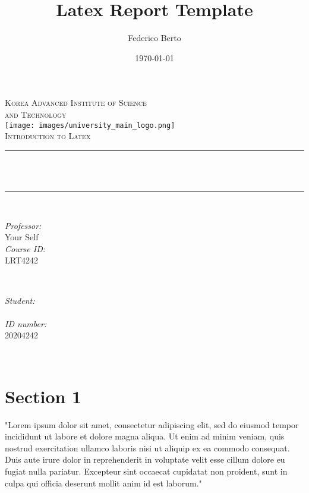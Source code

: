 \documentclass[12pt]{article}
\title{Latex Report Template}
\author{Federico Berto}
\date{\today}
\makeatletter
\newcommand{\professor}{Your Self}
\newcommand{\studentid}{20204242}
\newcommand{\coursename}{Introduction to Latex}
\newcommand{\courseid}{LRT4242}
\newcommand{\firstuniversityline}{Korea Advanced Institute of Science} %
\newcommand{\seconduniversityline}{and Technology} %
\let\thetitle\@title
\let\theauthor\@author
\makeatother
\begin{document}
\begin{titlepage}
	\centering
    \textsc{\LARGE  \firstuniversityline \\ \smallskip \seconduniversityline}\\[1 cm]	%
    \texttt{[image: images/university\_main\_logo.png]}\\[1.5 cm]	%
    
	\textsc{\Large \coursename}\\[0.5 cm]
	\rule{\linewidth}{0.2 mm} \\[0.4 cm]
	{ \huge \bfseries {\thetitle}}\\
	\rule{\linewidth}{0.2 mm} \\[1.5 cm]
	
	\begin{minipage}{0.5\textwidth}
		\begin{flushleft} \large
			\emph{Professor:}\\
		    \professor \\ [0.5cm]
            \emph{Course ID:}\\
            \courseid
			\end{flushleft}
			\end{minipage}~
			\begin{minipage}{0.4\textwidth}
			\begin{flushright} \large
			\emph{Student:} \\
			\theauthor \\[0.5cm]
			\emph{ID number:}\\
			\studentid \\
		\end{flushright}
	\end{minipage}\\[2 cm]
	
\end{titlepage}



\section{Section 1}
"Lorem ipsum dolor sit amet, consectetur adipiscing elit, sed do eiusmod tempor incididunt ut labore et dolore magna aliqua. Ut enim ad minim veniam, quis nostrud exercitation ullamco laboris nisi ut aliquip ex ea commodo consequat. Duis aute irure dolor in reprehenderit in voluptate velit esse cillum dolore eu fugiat nulla pariatur. Excepteur sint occaecat cupidatat non proident, sunt in culpa qui officia deserunt mollit anim id est laborum."
\end{document}
